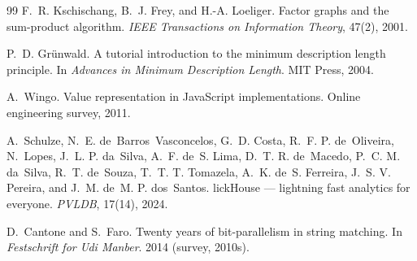 \documentclass[10pt]{article}
\begin{document}
\begin{thebibliography}{99}
F.~R. Kschischang, B.~J. Frey, and H.-A. Loeliger.
\newblock Factor graphs and the sum-product algorithm.
\newblock \emph{IEEE Transactions on Information Theory}, 47(2), 2001.

P.~D. Gr{\"u}nwald.
\newblock A tutorial introduction to the minimum description length
  principle.
\newblock In \emph{Advances in Minimum Description Length}. MIT Press, 2004.

A.~Wingo.
\newblock Value representation in {J}ava{S}cript implementations.
\newblock Online engineering survey, 2011.

A.~Schulze, N.~E. de~Barros~Vasconcelos, G.~D. Costa, R.~F. P. de~Oliveira,
N.~Lopes, J.~L. P. da~Silva, A.~F. de~S. Lima, D.~T. R. de~Macedo,
P.~C. M. da~Silva, R.~T. de~Souza, T.~T. T. Tomazela, A.~K. de~S. Ferreira,
J.~S. V. Pereira, and J.~M. de~M. P. dos~Santos.
lick{H}ouse --- lightning fast analytics for everyone.
\newblock \emph{PVLDB}, 17(14), 2024.

D.~Cantone and S.~Faro.
\newblock Twenty years of bit-parallelism in string matching.
\newblock In \emph{Festschrift for Udi Manber}. 2014 (survey, 2010s).

\end{thebibliography}
\end{document}
